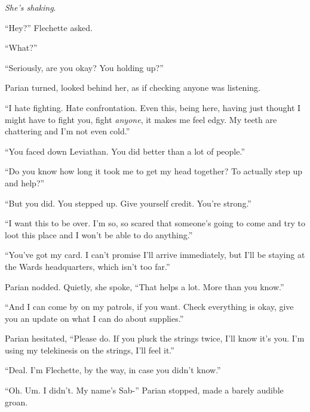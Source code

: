 \emph{She's shaking}.



``Hey?'' Flechette asked.



``What?''



``Seriously, are you okay?  You holding up?''



Parian turned, looked behind her, as if checking anyone was listening.



``I hate fighting.  Hate confrontation.  Even this, being here, having just thought I might have to fight you, fight \emph{anyone}, it makes me feel edgy.  My teeth are chattering and I'm not even cold.''



``You faced down Leviathan.  You did better than a lot of people.''



``Do you know how long it took me to get my head together?  To actually step up and help?''



``But you did.  You stepped up.  Give yourself credit.  You're strong.''



``I want this to be over.  I'm so, so scared that someone's going to come and try to loot this place and I won't be able to do anything.''



``You've got my card.  I can't promise I'll arrive immediately, but I'll be staying at the Wards headquarters, which isn't too far.''



Parian nodded.  Quietly, she spoke, ``That helps a lot.  More than you know.''



``And I can come by on my patrols, if you want.  Check everything is okay, give you an update on what I can do about supplies.''



Parian hesitated, ``Please do.  If you pluck the strings twice, I'll know it's you.  I'm using my telekinesis on the strings, I'll feel it.''



``Deal.  I'm Flechette, by the way, in case you didn't know.''



``Oh.  Um.  I didn't.  My name's Sab-'' Parian stopped, made a barely audible groan.



